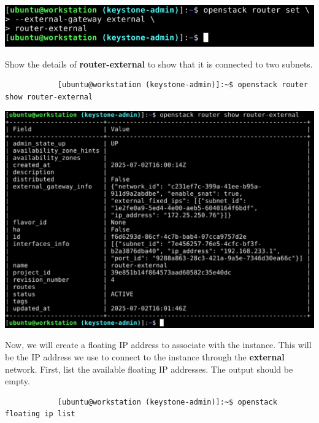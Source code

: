 \documentclass[letterpaper, 12pt]{article}
\begin{document}
\begin{enumerate}
\begin{labstep}
        \begin{center}
            \includegraphics[width=\linewidth]{images/part5/step17.png}
        \end{center}
    \end{labstep}

    \begin{labstep}
        Show the details of \textbf{router-external} to show that it is connected to two subnets.
        \begin{lstlisting}
            [ubuntu@workstation (keystone-admin)]:~$ openstack router show router-external
        \end{lstlisting}

        \begin{center}
            \includegraphics[width=\linewidth]{images/part5/step18.png}
        \end{center}
    \end{labstep}

    \begin{labstep}
        Now, we will create a floating IP address to associate with the instance.
        This will be the IP address we use to connect to the instance through the \textbf{external} network.
        First, list the available floating IP addresses.
        The output should be empty.
        \begin{lstlisting}
            [ubuntu@workstation (keystone-admin)]:~$ openstack floating ip list
        \end{lstlisting}


\end{labstep}
\end{enumerate}
\end{document}

